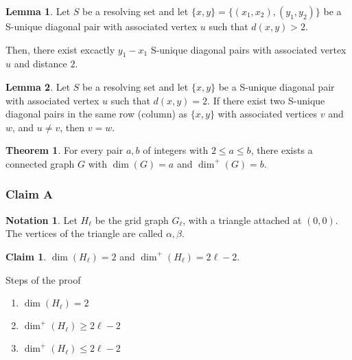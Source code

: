 \documentclass[hyperref={pdfpagelabels=false}]{beamer}
\theoremstyle{definition}
\newtheorem{ntn}{Notation}
\theoremstyle{theorem}
\newtheorem{lem}{Lemma}
\newtheorem{thm}{Theorem}
\newtheorem{clm}{Claim}
\begin{document}
\begin{frame}
	\begin{lem}
		Let $S$ be a resolving set and let $\{x,y\} = \{(x_1,x_2),(y_1,y_2)\}$ be a S-unique diagonal pair with associated vertex $u$ such that $d(x,y)>2$.

		Then, there exist excactly $y_1 - x_1$ S-unique diagonal pairs with associated vertex $u$ and distance $2$.
	\end{lem}
\end{frame}
\begin{frame}
	\begin{lem}
		Let $S$ be a resolving set and let $\{x,y\}$ be a S-unique diagonal pair with associated vertex $u$ such that $d(x,y)=2$. If there exist two S-unique diagonal pairs in the same row (column) as $\{x,y\}$ with associated vertices $v$ and $w$, and $u \neq v$, then $v = w$.
	\end{lem}
\end{frame}
\begin{frame}
	\begin{thm}
		For every pair $a,b$ of integers with $2 \leq a \leq b$, there exists a connected graph $G$ with $\dim(G) = a$ and $\dim^+(G) = b$.
	\end{thm}
\end{frame}
\begin{frame}
	\frametitle{Claim A}
	\begin{ntn}
		Let $H_\ell$ be the grid graph $G_\ell$, with a triangle attached at $(0,0)$. The vertices of the triangle are called $\alpha, \beta$.
	\end{ntn}
	\begin{clm}
		$\dim(H_\ell) = 2$ and $\dim^+(H_\ell) = 2\ell - 2$.
	\end{clm}
	\begin{block}{Steps of the proof}
		\begin{enumerate}
			\item $\dim(H_\ell) = 2$
			\item $\dim^+(H_\ell) \geq 2\ell - 2$
			\item $\dim^+(H_\ell) \leq 2\ell - 2$
		\end{enumerate}
	\end{block}
\end{frame}
\end{document}
